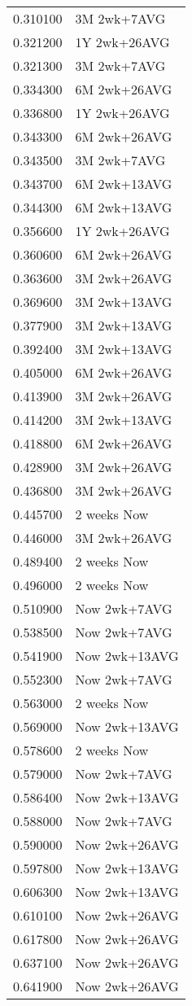 \begin{tabular}{rl}
0.310100 & 3M 2wk+7AVG \\
0.321200 & 1Y 2wk+26AVG \\
0.321300 & 3M 2wk+7AVG \\
0.334300 & 6M 2wk+26AVG \\
0.336800 & 1Y 2wk+26AVG \\
0.343300 & 6M 2wk+26AVG \\
0.343500 & 3M 2wk+7AVG \\
0.343700 & 6M 2wk+13AVG \\
0.344300 & 6M 2wk+13AVG \\
0.356600 & 1Y 2wk+26AVG \\
0.360600 & 6M 2wk+26AVG \\
0.363600 & 3M 2wk+26AVG \\
0.369600 & 3M 2wk+13AVG \\
0.377900 & 3M 2wk+13AVG \\
0.392400 & 3M 2wk+13AVG \\
0.405000 & 6M 2wk+26AVG \\
0.413900 & 3M 2wk+26AVG \\
0.414200 & 3M 2wk+13AVG \\
0.418800 & 6M 2wk+26AVG \\
0.428900 & 3M 2wk+26AVG \\
0.436800 & 3M 2wk+26AVG \\
0.445700 & 2 weeks Now \\
0.446000 & 3M 2wk+26AVG \\
0.489400 & 2 weeks Now \\
0.496000 & 2 weeks Now \\
0.510900 & Now 2wk+7AVG \\
0.538500 & Now 2wk+7AVG \\
0.541900 & Now 2wk+13AVG \\
0.552300 & Now 2wk+7AVG \\
0.563000 & 2 weeks Now \\
0.569000 & Now 2wk+13AVG \\
0.578600 & 2 weeks Now \\
0.579000 & Now 2wk+7AVG \\
0.586400 & Now 2wk+13AVG \\
0.588000 & Now 2wk+7AVG \\
0.590000 & Now 2wk+26AVG \\
0.597800 & Now 2wk+13AVG \\
0.606300 & Now 2wk+13AVG \\
0.610100 & Now 2wk+26AVG \\
0.617800 & Now 2wk+26AVG \\
0.637100 & Now 2wk+26AVG \\
0.641900 & Now 2wk+26AVG \\
\hline
\end{tabular}